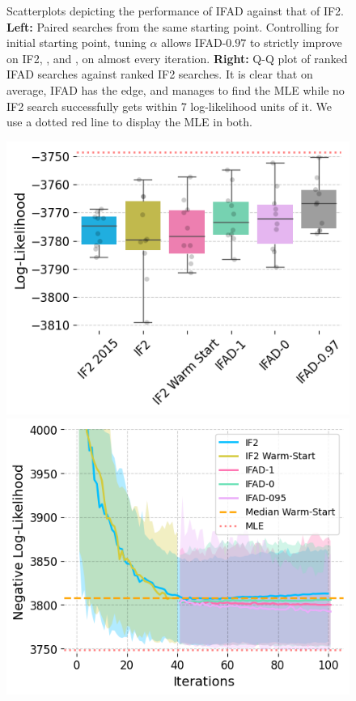 \documentclass[9pt,twocolumn,twoside]{pnas-new}
\begin{document}
\begin{figure}[htbp!]
    \caption{Scatterplots depicting the performance of IFAD against that of IF2. \textbf{Left:} Paired searches from the same starting point. Controlling for initial starting point, tuning $\alpha$ allows IFAD-$0.97$ to strictly improve on IF2, \cite{poyiadjis11}, and \cite{naesseth18}, on almost every iteration. \textbf{Right:} Q-Q plot of ranked IFAD searches against ranked IF2 searches. It is clear that on average, IFAD has the edge, and manages to find the MLE while no IF2 search successfully gets within 7 log-likelihood units of it. We use a dotted red line to display the MLE in both. }
    \label{fig:scatter-optim}
\end{figure}


\begin{figure}[ht]
    \includegraphics[width=\textwidth/\real{4.2}]{../imgs/095/boxplot.png}
    \includegraphics[width=\textwidth/\real{4.2}]{../imgs/095/optim.png}

\end{figure}
\end{document}
